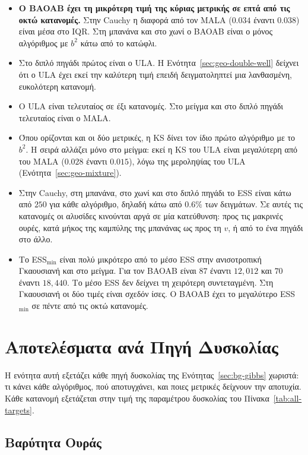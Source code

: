 \begin{itemize}
  \item \textbf{Ο BAOAB έχει τη μικρότερη τιμή της κύριας μετρικής σε επτά από τις
        οκτώ κατανομές.} Στην Cauchy η διαφορά από τον MALA ($0.034$ έναντι $0.038$)
        είναι μέσα στο IQR. Στη μπανάνα και στο χωνί ο BAOAB είναι ο μόνος αλγόριθμος
        με $b^2$ κάτω από το κατώφλι.
  \item Στο διπλό πηγάδι πρώτος είναι ο ULA. Η Ενότητα~\ref{sec:geo-double-well}
        δείχνει ότι ο ULA έχει εκεί την καλύτερη τιμή επειδή δειγματοληπτεί μια λανθασμένη, ευκολότερη
        κατανομή.
  \item Ο ULA είναι τελευταίος σε έξι κατανομές. Στο μείγμα και στο διπλό πηγάδι
        τελευταίος είναι ο MALA.
  \item Όπου ορίζονται και οι δύο μετρικές, η KS δίνει τον ίδιο πρώτο αλγόριθμο με το
        $b^2$. Η σειρά αλλάζει μόνο στο μείγμα: εκεί η KS του ULA είναι μεγαλύτερη από
        του MALA ($0.028$ έναντι $0.015$), λόγω της μεροληψίας του ULA
        (Ενότητα~\ref{sec:geo-mixture}).
  \item Στην Cauchy, στη μπανάνα, στο χωνί και στο διπλό πηγάδι το ESS είναι κάτω από
        $250$ για κάθε αλγόριθμο, δηλαδή κάτω από $0.6\%$ των δειγμάτων. Σε αυτές τις
        κατανομές οι αλυσίδες κινούνται αργά σε μία κατεύθυνση: προς τις μακρινές
        ουρές, κατά μήκος της καμπύλης της μπανάνας ως προς τη $v$, ή από το ένα πηγάδι στο
        άλλο.
  \item Το ESS$_{\min}$ είναι πολύ μικρότερο από το μέσο ESS στην ανισοτροπική
        Γκαουσιανή και στο μείγμα. Για τον BAOAB είναι $87$ έναντι $12{,}012$ και $70$
        έναντι $18{,}440$. Το μέσο ESS δεν δείχνει τη χειρότερη συντεταγμένη. Στη
        Γκαουσιανή οι δύο τιμές είναι σχεδόν ίσες. Ο BAOAB έχει το μεγαλύτερο
        ESS$_{\min}$ σε πέντε από τις οκτώ κατανομές.
\end{itemize}

\section{Αποτελέσματα ανά Πηγή Δυσκολίας}
\label{sec:per-source}

Η ενότητα αυτή εξετάζει κάθε πηγή δυσκολίας της Ενότητας~\ref{sec:bg-gibbs}
χωριστά: τι κάνει κάθε αλγόριθμος, πού αποτυγχάνει, και ποιες μετρικές δείχνουν
την αποτυχία. Κάθε κατανομή εξετάζεται στην τιμή της παραμέτρου δυσκολίας του
Πίνακα~\ref{tab:all-targets}.

\subsection{Βαρύτητα Ουράς}
\label{sec:tail-correlation}


